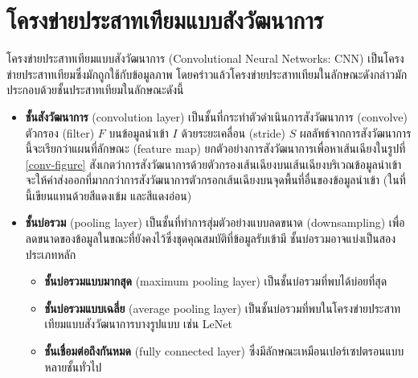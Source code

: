 \section{โครงข่ายประสาทเทียมแบบสังวัฒนาการ}

โครงข่ายประสาทเทียมแบบสังวัฒนาการ (Convolutional Neural Networks: CNN) \cite{lecun-1998} เป็นโครงข่ายประสาทเทียมซึ่งมักถูกใช้กับข้อมูลภาพ \cite{Krizhevsky-2012} โดยคร่าวแล้วโครงข่ายประสาทเทียมในลักษณะดังกล่าวมักประกอบด้วยชั้นประสาทเทียมในลักษณะดังนี้

\begin{itemize}
    \item \textbf{ชั้นสังวัฒนาการ} (convolution layer) เป็นชั้นที่กระทำตัวดำเนินการสังวัฒนาการ (convolve) ตัวกรอง (filter) $F$ บนข้อมูลนำเข้า $I$ ด้วยระยะเคลื่อน (stride) $S$ ผลลัพธ์จากการสังวัฒนาการนี้จะเรียกว่าแผนที่ลักษณะ (feature map) ยกตัวอย่างการสังวัฒนาการเพื่อหาเส้นเฉียงในรูปที่ \ref{conv-figure} สังเกตว่าการสังวัฒนาการด้วยตัวกรองเส้นเฉียงบนเส้นเฉียงบริเวณข้อมูลนำเข้า จะให้ค่าส่งออกที่มากกว่าการสังวัฒนาการตัวกรอกเส้นเฉียงบนจุดพื้นที่อื่นของข้อมูลนำเข้า (ในที่นี้เขียนแทนด้วยสีแดงเข้ม และสีแดงอ่อน)
    \item \textbf{ชั้นบ่อรวม} (pooling layer)
    เป็นชั้นที่ทำการสุ่มตัวอย่างแบบลดขนาด (downsampling) เพื่อลดขนาดของข้อมูลในขณะที่ยังคงไว้ซึ่งชุดคุณสมบัติที่ข้อมูลรับเข้ามี ชั้นบ่อรวมอาจแบ่งเป็นสองประเภทหลัก
    \begin{itemize} 
        \item \textbf{ชั้นบ่อรวมแบบมากสุด} (maximum pooling layer) เป็นชั้นบ่อรวมที่พบได้บ่อยที่สุด
        \item \textbf{ชั้นบ่อรวมแบบเฉลี่ย} (average pooling layer) เป็นชั้นบ่อรวมที่พบในโครงข่ายประสาทเทียมแบบสังวัฒนาการบางรูปแบบ เช่น LeNet
        \item \textbf{ชั้นเชื่อมต่อถึงกันหมด} (fully connected layer) ซึ่งมีลักษณะเหมือนเปอร์เซปตรอนแบบหลายชั้นทั่วไป
    \end{itemize}
\end{itemize}

